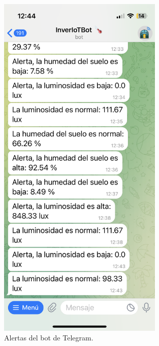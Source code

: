 \begin{figure}[h]
	\centering
	\includegraphics[width=0.7\textwidth]{img/desarrollo/BotTelegram_alertas.png}
	\caption{Alertas del bot de Telegram.} \label{Img:BotTelegram_alertas}
\end{figure}

